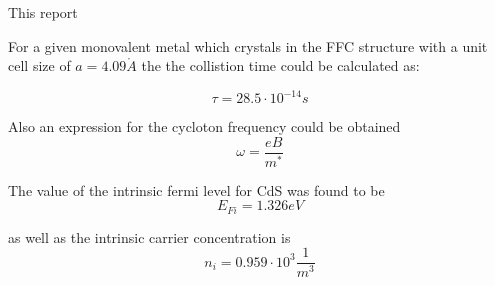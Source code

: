 


This report 


For a given monovalent metal which crystals in the FFC structure
with a unit cell size of  $a = 4.09 \mathring{A}$ the the collistion
time could be calculated as:

$$\tau = 28.5 \cdot 10^{-14}s$$

Also an expression for the cycloton frequency could be obtained
$$\omega = \frac{eB}{m^*}$$


The value of the intrinsic fermi level for CdS was found to be
$$E_{Fi} = 1.326 eV$$

as well as the intrinsic carrier concentration is
$$n_i = 0.959 \cdot 10^3 \frac{1}{m^3}$$
